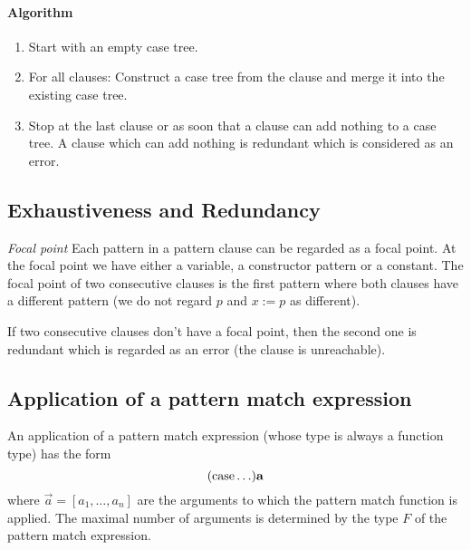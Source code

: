 \paragraph{Algorithm}

\begin{enumerate}
    \item Start with an empty case tree.

    \item For all clauses: Construct a case tree from the clause and merge it
        into the existing case tree.

    \item Stop at the last clause or as soon that a clause can add nothing to a
        case tree. A clause which can add nothing is redundant which is
        considered as an error.
\end{enumerate}







\subsection{Exhaustiveness and Redundancy}

\emph{Focal point}
Each pattern in a pattern clause can be regarded as a focal
point. At the focal point we have either a variable, a constructor pattern or a
constant. The focal point of two consecutive clauses is the first pattern where
both clauses have a different pattern (we do not regard $p$ and $x:=p$ as
different).

If two consecutive clauses don't have a focal point, then the second one is
redundant which is regarded as an error (the clause is unreachable).








\subsection{Application of a pattern match expression}

An application of a pattern match expression (whose type is always a function
type) has the form
$$
({\text{case}} \ldots) {\mathbf a}
$$
where $\vec a = [a_1, \ldots, a_n]$ are the arguments to which the pattern match
function is applied. The maximal number of arguments is determined by the type
$F$ of the pattern match expression.

